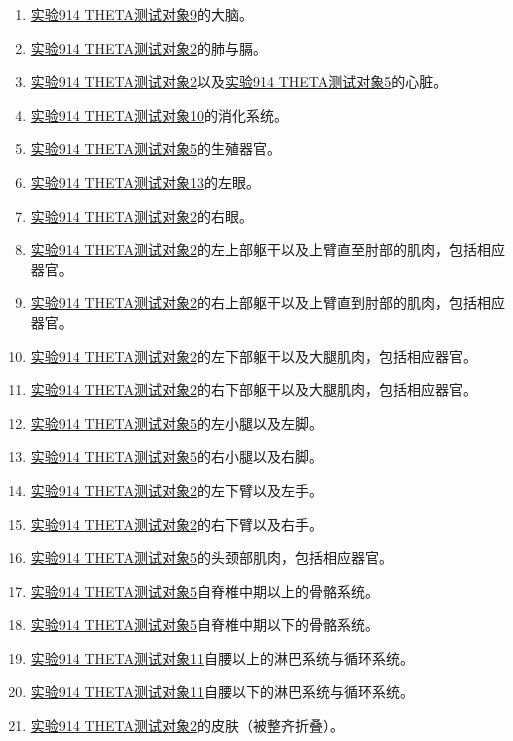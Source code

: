 \begin{enumerate}
\item \hyperref[sec:DOC-experiment-log-914-theta.9]{实验914 THETA测试对象9}的大脑。
\item \hyperref[sec:DOC-experiment-log-914-theta.2]{实验914 THETA测试对象2}的肺与膈。
\item \hyperref[sec:DOC-experiment-log-914-theta.2]{实验914 THETA测试对象2}以及\hyperref[sec:DOC-experiment-log-914-theta.5]{实验914 THETA测试对象5}的心脏。
\item \hyperref[sec:DOC-experiment-log-914-theta.10]{实验914 THETA测试对象10}的消化系统。
\item \hyperref[sec:DOC-experiment-log-914-theta.5]{实验914 THETA测试对象5}的生殖器官。
\item \hyperref[sec:DOC-experiment-log-914-theta.13]{实验914 THETA测试对象13}的左眼。
\item \hyperref[sec:DOC-experiment-log-914-theta.2]{实验914 THETA测试对象2}的右眼。
\item \hyperref[sec:DOC-experiment-log-914-theta.2]{实验914 THETA测试对象2}的左上部躯干以及上臂直至肘部的肌肉，包括相应器官。
\item \hyperref[sec:DOC-experiment-log-914-theta.2]{实验914 THETA测试对象2}的右上部躯干以及上臂直到肘部的肌肉，包括相应器官。
\item \hyperref[sec:DOC-experiment-log-914-theta.2]{实验914 THETA测试对象2}的左下部躯干以及大腿肌肉，包括相应器官。
\item \hyperref[sec:DOC-experiment-log-914-theta.2]{实验914 THETA测试对象2}的右下部躯干以及大腿肌肉，包括相应器官。
\item \hyperref[sec:DOC-experiment-log-914-theta.5]{实验914 THETA测试对象5}的左小腿以及左脚。
\item \hyperref[sec:DOC-experiment-log-914-theta.5]{实验914 THETA测试对象5}的右小腿以及右脚。
\item \hyperref[sec:DOC-experiment-log-914-theta.2]{实验914 THETA测试对象2}的左下臂以及左手。
\item \hyperref[sec:DOC-experiment-log-914-theta.2]{实验914 THETA测试对象2}的右下臂以及右手。
\item \hyperref[sec:DOC-experiment-log-914-theta.5]{实验914 THETA测试对象5}的头颈部肌肉，包括相应器官。
\item \hyperref[sec:DOC-experiment-log-914-theta.5]{实验914 THETA测试对象5}自脊椎中期以上的骨骼系统。
\item \hyperref[sec:DOC-experiment-log-914-theta.5]{实验914 THETA测试对象5}自脊椎中期以下的骨骼系统。
\item \hyperref[sec:DOC-experiment-log-914-theta.11]{实验914 THETA测试对象11}自腰以上的淋巴系统与循环系统。
\item \hyperref[sec:DOC-experiment-log-914-theta.11]{实验914 THETA测试对象11}自腰以下的淋巴系统与循环系统。
\item \hyperref[sec:DOC-experiment-log-914-theta.2]{实验914 THETA测试对象2}的皮肤（被整齐折叠）。
\end{enumerate}

